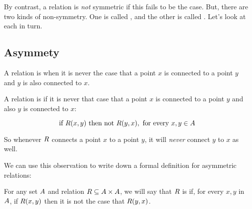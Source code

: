 \documentclass[../../../main.tex]{subfiles}
\begin{document}
By contrast, a relation is \emph{not} symmetric if this fails to be the case. But, there are two kinds of non-symmetry. One is called , and the other is called . Let's look at each in turn.


\subsection{Asymmety}

\begin{terminology}
  A relation is  when it is never the case that a point $x$ is connected to a point $y$ and $y$ is also connected to $x$.
\end{terminology}

A relation is  if it is never that case that a point $x$ is connected to a point $y$ and also $y$ is connected to $x$:

\begin{equation*}
  \text{ if } R(x, y) \text{ then not } R(y, x), \text{ for every $x, y \in A$ }
\end{equation*}

So whenever $R$ connects a point $x$ to a point $y$, it will \emph{never} connect $y$ to $x$ as well.

We can use this observation to write down a formal definition for asymmetric relations:

\begin{fdefinition}
  \label{def:asymmetric-relations}
  For any set $A$ and relation $R \subseteq A \times A$, we will say that $R$ is  if, for every $x, y$ in $A$, if $R(x, y)$ then it is not the case that $R(y, x)$.
\end{fdefinition}
\end{document}
